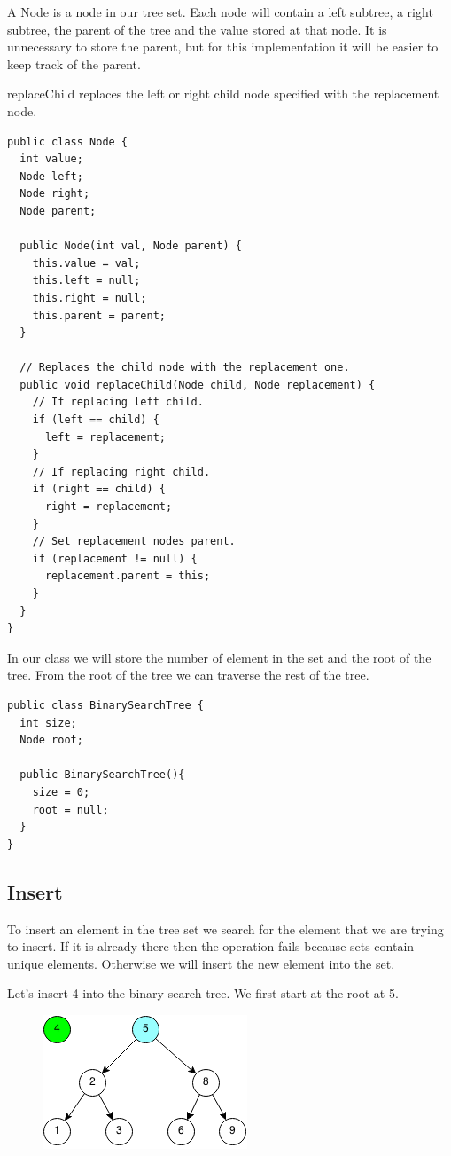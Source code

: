 \documentclass[11pt,oneside]{book}
\makeatletter
\def\maxwidth#1{\ifdim\Gin@nat@width>#1 #1\else\Gin@nat@width\fi}
\makeatother
\begin{document}
A Node is a node in our tree set. Each node will contain a left subtree, a right subtree, the parent of the tree and the value stored at that node. It is unnecessary to store the parent, but for this implementation it will be easier to keep track of the parent.

replaceChild replaces the left or right child node specified with the replacement node.

\begin{lstlisting}
public class Node {
  int value;
  Node left;
  Node right;
  Node parent;

  public Node(int val, Node parent) {
    this.value = val;
    this.left = null;
    this.right = null;
    this.parent = parent;
  }

  // Replaces the child node with the replacement one.
  public void replaceChild(Node child, Node replacement) {
    // If replacing left child.
    if (left == child) {
      left = replacement;
    }
    // If replacing right child.
    if (right == child) {
      right = replacement;
    }
    // Set replacement nodes parent.
    if (replacement != null) {
      replacement.parent = this;
    }
  }
}
\end{lstlisting}

In our class we will store the number of element in the set and the root of the tree. From the root of the tree we can traverse the rest of the tree.

\begin{lstlisting}
public class BinarySearchTree {
  int size;
  Node root;
    
  public BinarySearchTree(){
    size = 0;
    root = null;
  }
}
\end{lstlisting}

\subsection{Insert}

To insert an element in the tree set we search for the element that we are trying to insert. If it is already there then the operation fails because sets contain unique elements. Otherwise we will insert the new element into the set.

Let's insert 4 into the binary search tree. We first start at the root at 5.

\vspace{5px}\begin{figure}[H]\centering
        \includegraphics[width=0.66\maxwidth{\textwidth}]{bstinsert.png}
        \end{figure}
\end{document}
